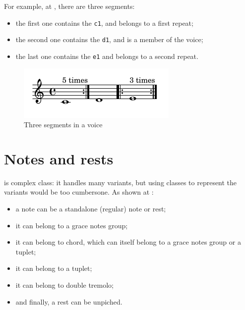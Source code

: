 For example, at , there are three segments:
\begin{itemize}
\item the first one contains the {\tt c1}, and belongs to a first repeat;
\item the second one contains the {\tt d1}, and is a member of the voice;
\item the last one contains the {\tt e1} and belongs to a second repeat.
\end{itemize}

\begin{figure}[htbp]
\begin{center}
\includegraphics{../graphics/RepeatFollowedByANoteAndARepeat.png}

\caption{Three segments in a voice}
\label{Three segments in a voice}
\end{center}
\end{figure}


\section{Notes and rests}\label{Notes and rests}

 is complex class: it handles many variants, but using classes to represent the variants would be too cumbersone. As shown at :
\begin{itemize}
\item a note can be a standalone (regular) note or rest;
\item it can belong to a grace notes group;
\item it can belong to chord, which can itself belong to a grace notes group or a tuplet;
\item it can belong to a tuplet;
\item it can belong to double tremolo;
\item and finally, a rest can be unpiched.
\end{itemize}

